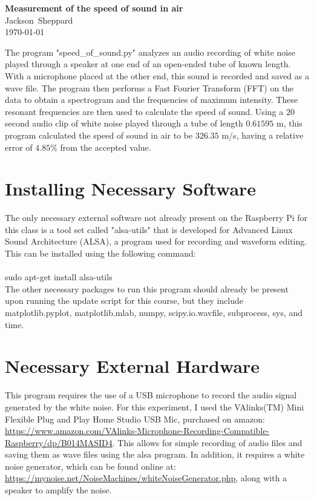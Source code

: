 \documentclass[12pt]{article}
\newcommand\thisis{Measurement of the speed of sound in air}
\newcommand\theauthor{Jackson~Sheppard}
\begin{document}
\thispagestyle{firstpg}

\noindent
{\sffamily\bfseries\huge \thisis}\\

\noindent
{\large\sffamily \theauthor}\\
\today
\vspace*{20bp}

\noindent
The program "speed\_of\_sound.py" analyzes an audio recording of white
noise played through a speaker at one end of an open-ended tube of known length.
With a microphone placed at the other end, this sound is recorded
and saved as a wave file. The program then performs a Fast Fourier
Transform (FFT) on the data to obtain a spectrogram and the frequencies
of maximum intensity. These resonant frequencies are
then used to calculate the speed of sound. Using a $20$ second audio
clip of white noise played through a tube of length $0.61595$ m, this
program calculated the speed of sound in air to be $326.35$ m/s, having
a relative error of $4.85\%$ from the accepted value.

\section{Installing Necessary Software}
The only necessary external software not already present on the
Raspberry Pi for this class is a tool set called "alsa-utils" that is 
developed for Advanced Linux Sound Architecture (ALSA), a program used 
for recording and waveform editing. This can be installed using the following
command:
\\
\\
sudo apt-get install alsa-utils
\\

The other necessary packages to run this program should already be present upon running the update script for this course, but they include
matplotlib.pyplot, matplotlib.mlab, numpy, scipy.io.wavfile, subprocess,
sys, and time.

\section{Necessary External Hardware}
This program requires the use of a USB microphone to record the audio signal
generated by the white noise. For this experiment, I used the VAlinks(TM) Mini
Flexible Plug and Play Home Studio USB Mic, purchased on amazon:
\url{https://www.amazon.com/VAlinks-Microphone-Recording-Compatible-Raspberry/dp/B014MASID4}. 
This allows for simple recording of audio files and saving them as wave files
using the alsa program. In addition, it requires a white noise generator, which
can be found online at: 
\url{https://mynoise.net/NoiseMachines/whiteNoiseGenerator.php},
along with a speaker to amplify the noise.
\end{document}
